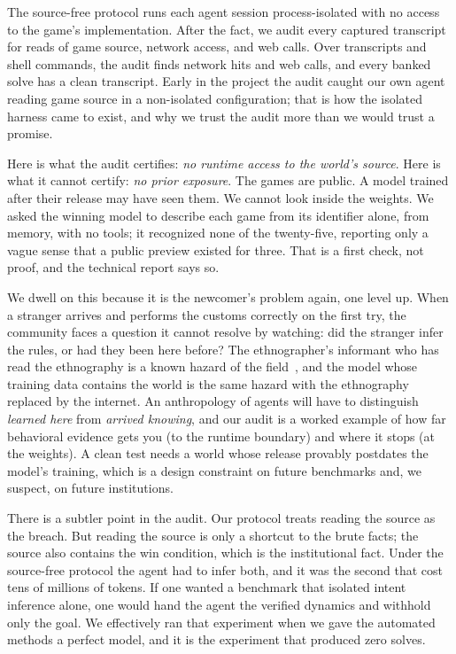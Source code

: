 \documentclass[11pt]{article}
\begin{document}
The source-free protocol runs each agent session process-isolated with no access to the game's
implementation. After the fact, we audit every captured transcript for reads of game source, network
access, and web calls. Over \ArcAuditTranscripts{} transcripts and \ArcAuditBashCmds{} shell commands, the
audit finds \ArcAuditNetHits{} network hits and \ArcAuditWebCalls{} web calls, and every banked solve has
a clean transcript. Early in the project the audit caught our own agent reading game source in a
non-isolated configuration; that is how the isolated harness came to exist, and why we trust the audit
more than we would trust a promise.

Here is what the audit certifies: \emph{no runtime access to the world's source}. Here is what it cannot
certify: \emph{no prior exposure}. The games are public. A model trained after their release may have
seen them. We cannot look inside the weights. We asked the winning model to describe each game from its
identifier alone, from memory, with no tools; it recognized none of the twenty-five, reporting only a
vague sense that a public preview existed for three. That is a first check, not proof, and the technical
report says so.

We dwell on this because it is the newcomer's problem again, one level up. When a stranger arrives and
performs the customs correctly on the first try, the community faces a question it cannot resolve by
watching: did the stranger infer the rules, or had they been here before? The ethnographer's informant who
has read the ethnography is a known hazard of the field~\cite{geertz1973interpretation}, and the model
whose training data contains the world is the same hazard with the ethnography replaced by the internet.
An anthropology of agents will have to distinguish \emph{learned here} from \emph{arrived knowing}, and our
audit is a worked example of how far behavioral evidence gets you (to the runtime boundary) and where it
stops (at the weights). A clean test needs a world whose release provably postdates the model's training,
which is a design constraint on future benchmarks and, we suspect, on future institutions.

There is a subtler point in the audit. Our protocol treats reading the source as the breach. But reading
the source is only a shortcut to the brute facts; the source also contains the win condition, which is the
institutional fact. Under the source-free protocol the agent had to infer both, and it was the second that
cost tens of millions of tokens. If one wanted a benchmark that isolated intent inference alone, one would
hand the agent the verified dynamics and withhold only the goal. We effectively ran that experiment when we
gave the automated methods a perfect model, and it is the experiment that produced zero solves.
\end{document}
